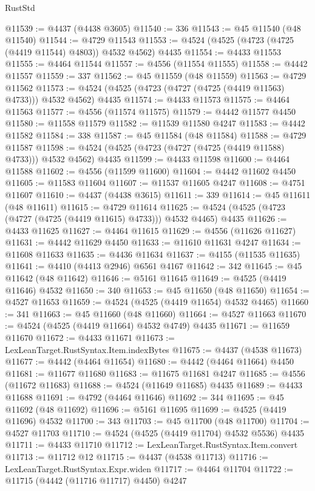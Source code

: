 \begin{lexlean}{RustStd}
\begin{coremodule}
@11539 := @4437 (@4438 @3605)
@11540 := 336
@11543 := @45 @11540 (@48 @11540)
@11544 := @4729 @11543
@11553 := @4524 (@4525 (@4723 (@4725 (@4419 @11544) @4803)) @4532 @4562) @4435
@11554 := @4433 @11553
@11555 := @4464 @11544
@11557 := @4556 (@11554 @11555)
@11558 := @4442 @11557
@11559 := 337
@11562 := @45 @11559 (@48 @11559)
@11563 := @4729 @11562
@11573 := @4524 (@4525 (@4723 (@4727 (@4725 (@4419 @11563) @4733))) @4532 @4562) @4435
@11574 := @4433 @11573
@11575 := @4464 @11563
@11577 := @4556 (@11574 @11575)
@11579 := @4442 @11577 @4450
@11580 := @11558 @11579
@11582 := @11539 @11580 @4247
@11583 := @4442 @11582
@11584 := 338
@11587 := @45 @11584 (@48 @11584)
@11588 := @4729 @11587
@11598 := @4524 (@4525 (@4723 (@4727 (@4725 (@4419 @11588) @4733))) @4532 @4562) @4435
@11599 := @4433 @11598
@11600 := @4464 @11588
@11602 := @4556 (@11599 @11600)
@11604 := @4442 @11602 @4450
@11605 := @11583 @11604
@11607 := @11537 @11605 @4247
@11608 := @4751 @11607
@11610 := @4437 (@4438 @3615)
@11611 := 339
@11614 := @45 @11611 (@48 @11611)
@11615 := @4729 @11614
@11625 := @4524 (@4525 (@4723 (@4727 (@4725 (@4419 @11615) @4733))) @4532 @4465) @4435
@11626 := @4433 @11625
@11627 := @4464 @11615
@11629 := @4556 (@11626 @11627)
@11631 := @4442 @11629 @4450
@11633 := @11610 @11631 @4247
@11634 := @11608 @11633
@11635 := @4436 @11634
@11637 := @4155 (@11535 @11635)
@11641 := @4410 (@4413 @2946) @6561 @4167
@11642 := 342
@11645 := @45 @11642 (@48 @11642)
@11646 := @5161 @11645
@11649 := @4525 (@4419 @11646) @4532
@11650 := 340
@11653 := @45 @11650 (@48 @11650)
@11654 := @4527 @11653
@11659 := @4524 (@4525 (@4419 @11654) @4532 @4465)
@11660 := 341
@11663 := @45 @11660 (@48 @11660)
@11664 := @4527 @11663
@11670 := @4524 (@4525 (@4419 @11664) @4532 @4749) @4435
@11671 := @11659 @11670
@11672 := @4433 @11671
@11673 := LexLeanTarget.RustSyntax.Item.indexBytes
@11675 := @4437 (@4538 @11673)
@11677 := @4442 (@4464 @11654)
@11680 := @4442 (@4464 @11664) @4450
@11681 := @11677 @11680
@11683 := @11675 @11681 @4247
@11685 := @4556 (@11672 @11683)
@11688 := @4524 (@11649 @11685) @4435
@11689 := @4433 @11688
@11691 := @4792 (@4464 @11646)
@11692 := 344
@11695 := @45 @11692 (@48 @11692)
@11696 := @5161 @11695
@11699 := @4525 (@4419 @11696) @4532
@11700 := 343
@11703 := @45 @11700 (@48 @11700)
@11704 := @4527 @11703
@11710 := @4524 (@4525 (@4419 @11704) @4532 @5536) @4435
@11711 := @4433 @11710
@11712 := LexLeanTarget.RustSyntax.Item.convert
@11713 := @11712 @12
@11715 := @4437 (@4538 @11713)
@11716 := LexLeanTarget.RustSyntax.Expr.widen
@11717 := @4464 @11704
@11722 := @11715 (@4442 (@11716 @11717) @4450) @4247

\end{coremodule}
\end{lexlean}

